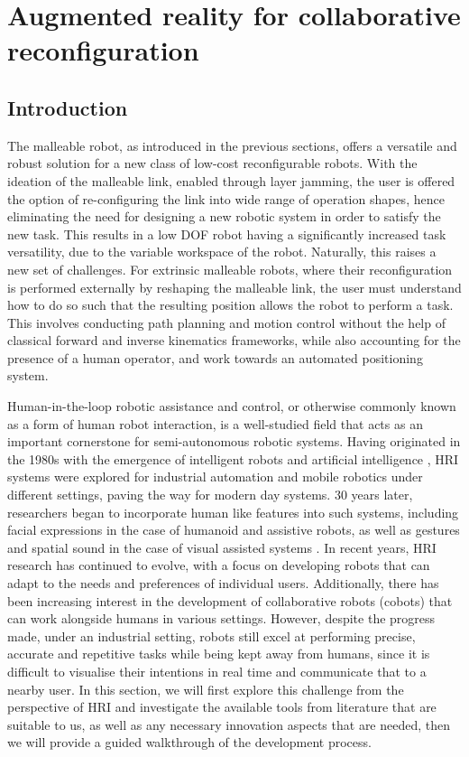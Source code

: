 

\section{Augmented reality for collaborative reconfiguration}

\subsection{Introduction} \label{Introduction}

The malleable robot, as introduced in the previous sections, offers a versatile and robust solution for a new class of low-cost reconfigurable robots. With the ideation of the malleable link, enabled through layer jamming, the user is offered the option of re-configuring the link into wide range of operation shapes, hence eliminating the need for designing a new robotic system in order to satisfy the new task. This results in a low DOF robot having a significantly increased task versatility, due to the variable workspace of the robot. Naturally, this raises a new set of challenges. For extrinsic malleable robots, where their reconfiguration is performed externally by reshaping the malleable link, the user must understand how to do so such that the resulting position allows the robot to perform a task. This involves conducting path planning and motion control without the help of classical forward and inverse kinematics frameworks, while also accounting for the presence of a human operator, and work towards an automated positioning system. 

Human-in-the-loop robotic assistance and control, or otherwise commonly known as a form of human robot interaction, is a well-studied field that acts as an important cornerstone for semi-autonomous robotic systems. Having originated in the 1980s with the emergence of intelligent robots and artificial intelligence \cite{dautenhahn2007socially}, HRI systems were explored for industrial automation and mobile robotics under different settings, paving the way for modern day systems. 30 years later, researchers began to incorporate human like features into such systems, including facial expressions in the case of humanoid and assistive robots, as well as gestures and spatial sound in the case of visual assisted systems \cite{makhataeva2020augmented}. In recent years, HRI research has continued to evolve, with a focus on developing robots that can adapt to the needs and preferences of individual users. Additionally, there has been increasing interest in the development of collaborative robots (cobots) that can work alongside humans in various settings. However, despite the progress made, under an industrial setting, robots still excel at performing precise, accurate and repetitive tasks while being kept away from humans, since it is difficult to visualise their intentions in real time and communicate that to a nearby user.
In this section, we will first explore this challenge from the perspective of HRI and investigate the available tools from literature that are suitable to us, as well as any necessary innovation aspects that are needed, then we will provide a guided walkthrough of the development process.



